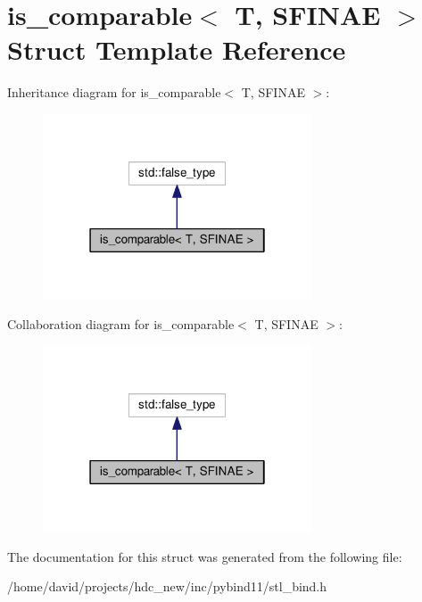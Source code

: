 \hypertarget{structis__comparable}{}\section{is\+\_\+comparable$<$ T, S\+F\+I\+N\+AE $>$ Struct Template Reference}
\label{structis__comparable}


Inheritance diagram for is\+\_\+comparable$<$ T, S\+F\+I\+N\+AE $>$\+:
\nopagebreak
\begin{figure}[H]
\begin{center}
\leavevmode
\includegraphics[width=226pt]{structis__comparable__inherit__graph}
\end{center}
\end{figure}


Collaboration diagram for is\+\_\+comparable$<$ T, S\+F\+I\+N\+AE $>$\+:
\nopagebreak
\begin{figure}[H]
\begin{center}
\leavevmode
\includegraphics[width=226pt]{structis__comparable__coll__graph}
\end{center}
\end{figure}


The documentation for this struct was generated from the following file\+:\begin{DoxyCompactItemize}
\item 
/home/david/projects/hdc\+\_\+new/inc/pybind11/stl\+\_\+bind.\+h\end{DoxyCompactItemize}
